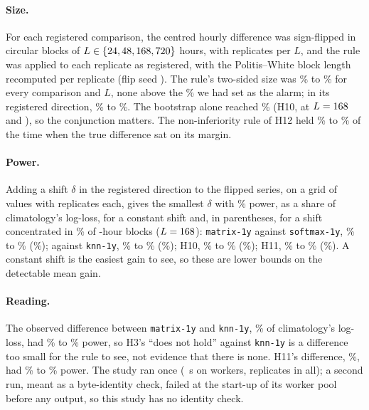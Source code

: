 \documentclass[11pt]{article}
\newcommand{\pct}{\%}
\begin{document}
\paragraph{Size.} For each registered comparison, the centred hourly difference was sign-flipped
in circular blocks of $L \in \{24, 48, 168, 720\}$ hours, with
\NumPowSizeReps{} replicates per $L$, and the rule was applied to each replicate as registered,
with the Politis--White block length~\cite{politiswhite2004,patton2009} %
recomputed per replicate (flip seed \NumPowSeed). The rule's
two-sided size was \NumPowSizeLo\pct{} to \NumPowSizeHi\pct{} for every comparison and $L$, none
above the \NumPowSizeCap\pct{} we had set as the alarm; in its registered direction,
\NumPowDirLo\pct{} to \NumPowDirHi\pct. The bootstrap alone reached \NumPowBootMax\pct{} (H10, at
$L=168$ and \NumPowBootLb), so the conjunction matters. The non-inferiority rule of H12
held \NumPowTwelveLo\pct{} to \NumPowTwelveHi\pct{} of the time when the true difference sat on its
margin.

\paragraph{Power.} Adding a shift $\delta$ in the registered direction to the flipped series, on a
grid of \NumPowGrid{} values with \NumPowGridReps{} replicates each, gives the smallest $\delta$
with \NumPowTarget\pct{} power, as a share of climatology's log-loss, for a constant shift and,
in parentheses, for a shift concentrated in \NumPowConcPct\pct{} of \NumPowConcBlock-hour blocks
($L=168$): \texttt{matrix-1y} against \texttt{softmax-1y}, \NumPowSmLo\pct{} to
\NumPowSmHi\pct{} (\NumPowSmConc\pct); against \texttt{knn-1y}, \NumPowKnLo\pct{} to
\NumPowKnHi\pct{} (\NumPowKnConc\pct); H10, \NumPowTenLo\pct{} to \NumPowTenHi\pct{}
(\NumPowTenConc\pct); H11, \NumPowElLo\pct{} to \NumPowElHi\pct{} (\NumPowElConc\pct).
A constant shift is the easiest gain to see, so these are lower bounds on the detectable mean gain.

\paragraph{Reading.} The observed difference between \texttt{matrix-1y} and \texttt{knn-1y},
\NumPowKnObs\pct{} of climatology's log-loss, had \NumPowKnObsLo\pct{} to \NumPowKnObsHi\pct{}
power, so H3's ``does not hold'' against \texttt{knn-1y} is a difference too small for the rule to
see, not evidence that there is none. H11's difference, \NumPowElObs\pct, had \NumPowElObsLo\pct{}
to \NumPowElObsHi\pct{} power.
The study ran once (\NumPowSecs{}~s on \NumPowWorkers{} workers, \NumPowReps{} replicates in all);
a second run, meant as a byte-identity check, failed at the start-up of its worker pool before any
output, so this study has no identity check.
\end{document}
